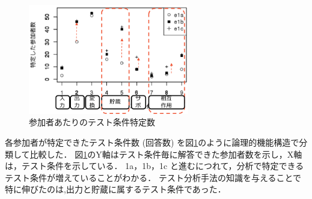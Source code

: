 \begin{figure}[htbp]
  \begin{center}
  \includegraphics[width=7cm]{./image/D-3-Fig12-1.png}
  \caption{参加者あたりのテスト条件特定数}
  \label{fig:D-3-Fig12-1}
  \end{center}
\end{figure}
各参加者が特定できたテスト条件数 (回答数) を図\ref{fig:D-3-Fig12-1}のように論理的機能構造で分類して比較した．
図\ref{fig:D-3-Fig12-1}のY軸はテスト条件毎に解答できた参加者数を示し，X軸は，テスト条件を示している．
1a，1b，1c と進むにつれて，分析で特定できるテスト条件が増えていることがわかる．
テスト分析手法の知識を与えることで特に伸びたのは,出力と貯蔵に属するテスト条件であった．


